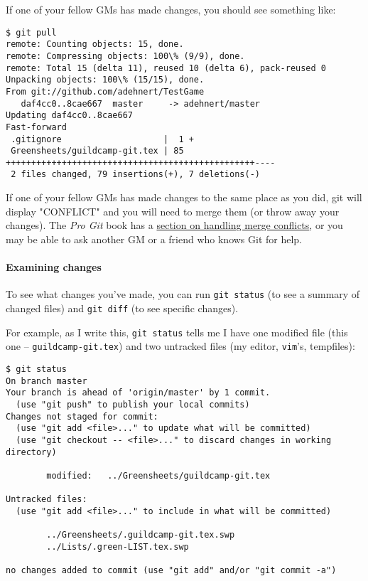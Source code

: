\documentclass[green]{testgame}
\begin{document}
If one of your fellow GMs has made changes, you should see something like:
\begin{verbatim}
$ git pull
remote: Counting objects: 15, done.
remote: Compressing objects: 100\% (9/9), done.
remote: Total 15 (delta 11), reused 10 (delta 6), pack-reused 0
Unpacking objects: 100\% (15/15), done.
From git://github.com/adehnert/TestGame
   daf4cc0..8cae667  master     -> adehnert/master
Updating daf4cc0..8cae667
Fast-forward
 .gitignore                    |  1 +
 Greensheets/guildcamp-git.tex | 85 +++++++++++++++++++++++++++++++++++++++++++++++++----
 2 files changed, 79 insertions(+), 7 deletions(-)
\end{verbatim}

If one of your fellow GMs has made changes to the same place as you did, git will display "CONFLICT" and you will need to merge them (or throw away your changes). The \emph{Pro Git} book has a \href{https://git-scm.com/book/en/v2/Git-Branching-Basic-Branching-and-Merging#_basic_merge_conflicts}{section on handling merge conflicts}, or you may be able to ask another GM or a friend who knows Git for help.

\paragraph*{Examining changes}

To see what changes you've made, you can run \texttt{git status} (to see a summary of changed files) and \texttt{git diff} (to see specific changes).

For example, as I write this, \texttt{git status} tells me I have one modified file (this one -- \texttt{guildcamp-git.tex}) and two untracked files (my editor, \texttt{vim}'s, tempfiles):
\begin{verbatim}
$ git status
On branch master
Your branch is ahead of 'origin/master' by 1 commit.
  (use "git push" to publish your local commits)
Changes not staged for commit:
  (use "git add <file>..." to update what will be committed)
  (use "git checkout -- <file>..." to discard changes in working directory)

        modified:   ../Greensheets/guildcamp-git.tex

Untracked files:
  (use "git add <file>..." to include in what will be committed)

        ../Greensheets/.guildcamp-git.tex.swp
        ../Lists/.green-LIST.tex.swp

no changes added to commit (use "git add" and/or "git commit -a")
\end{verbatim}
\end{document}
